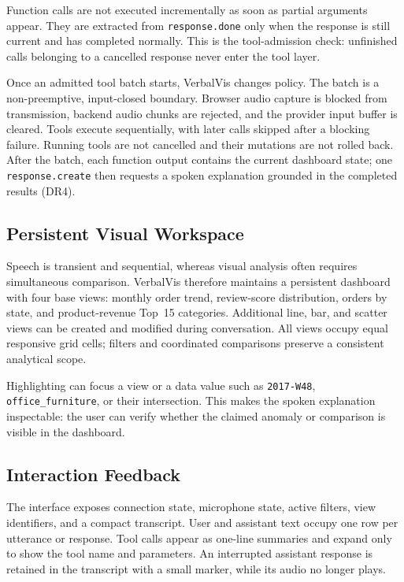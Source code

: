 \documentclass[journal]{IEEEtran}
\begin{document}
Function calls are not executed incrementally as soon as partial arguments appear. They are extracted from \texttt{response.done} only when the response is still current and has completed normally. This is the tool-admission check: unfinished calls belonging to a cancelled response never enter the tool layer.

Once an admitted tool batch starts, VerbalVis changes policy. The batch is a non-preemptive, input-closed boundary. Browser audio capture is blocked from transmission, backend audio chunks are rejected, and the provider input buffer is cleared. Tools execute sequentially, with later calls skipped after a blocking failure. Running tools are not cancelled and their mutations are not rolled back. After the batch, each function output contains the current dashboard state; one \texttt{response.create} then requests a spoken explanation grounded in the completed results (DR4).

\subsection{Persistent Visual Workspace}
\label{sec:design-workspace}

Speech is transient and sequential, whereas visual analysis often requires simultaneous comparison. VerbalVis therefore maintains a persistent dashboard with four base views: monthly order trend, review-score distribution, orders by state, and product-revenue Top~15 categories. Additional line, bar, and scatter views can be created and modified during conversation. All views occupy equal responsive grid cells; filters and coordinated comparisons preserve a consistent analytical scope.

Highlighting can focus a view or a data value such as \texttt{2017-W48}, \texttt{office\_furniture}, or their intersection. This makes the spoken explanation inspectable: the user can verify whether the claimed anomaly or comparison is visible in the dashboard.

\subsection{Interaction Feedback}
\label{sec:design-feedback}

The interface exposes connection state, microphone state, active filters, view identifiers, and a compact transcript. User and assistant text occupy one row per utterance or response. Tool calls appear as one-line summaries and expand only to show the tool name and parameters. An interrupted assistant response is retained in the transcript with a small marker, while its audio no longer plays.
\end{document}
